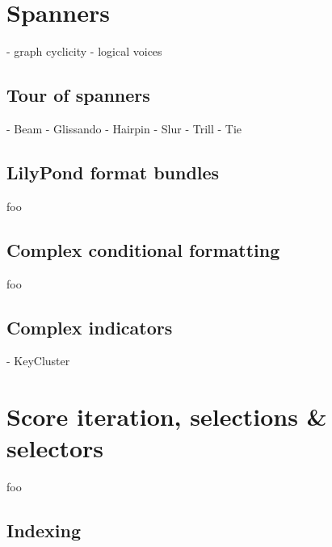 \section{Spanners}

\begin{markdown}
-   graph cyclicity
-   logical voices
\end{markdown}

\subsection{Tour of spanners}

\begin{markdown}
-   Beam
-   Glissando
-   Hairpin
-   Slur
-   Trill
-   Tie
\end{markdown}

\subsection{LilyPond format bundles}

foo

\subsection{Complex conditional formatting}

foo

\subsection{Complex indicators}

\begin{markdown}
-   KeyCluster
\end{markdown}

\section{Score iteration, selections \& selectors}

foo

\subsection{Indexing}
\label{ssec:indexing}

